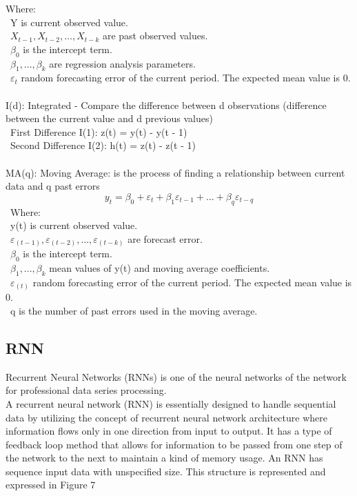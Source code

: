 \documentclass{ieeeojies}
\begin{document}
Where:\\
	\indent\textbullet\ Y is current observed value.\\
	\indent\textbullet\ \(X_{t-1}, X_{t-2}, \ldots, X_{t-k}\) are past observed
values.\\
	\indent\textbullet\ \(\beta_0\) is the intercept term.\\
	\indent\textbullet\ \(\beta_1,..., \beta_k\) are regression analysis
parameters.\\
	\indent\textbullet\ \(\varepsilon_{t}\) random forecasting error of the current
period. The expected mean value is 0.\\
\\
\indent I(d): Integrated - Compare the difference between d observations (difference
between the current value and d previous values)\\
\indent\textbullet\ First Difference I(1): z(t) = y(t) - y(t - 1)\\
\indent\textbullet\ Second Difference I(2): h(t) = z(t) - z(t - 1)\\
\\
\indent MA(q): Moving Average: is the process of finding a relationship between
current data and q past errors\
\indent \[y_{t} = \beta_0 + \varepsilon_{t} + \beta_1\varepsilon_{t - 1} + \ldots + \beta_q\varepsilon_{t - q}\]\
Where:\\
        \indent\textbullet\ y(t) is current observed value.\\
	\indent\textbullet\ \(\varepsilon_(t-1), \varepsilon_(t-2), \ldots, \varepsilon_(t-k)\) are forecast error.\\
	\indent\textbullet\ \(\beta_0\) is the intercept term.\\
	\indent\textbullet\ \(\beta_1,..., \beta_k\) mean values of y(t) and moving
average coefficients.\\
	\indent\textbullet\ \(\varepsilon_(t)\) random forecasting error of the current
period. The expected mean value is 0.\\
        \indent\textbullet\ q is the number of past errors used in the moving average.

\subsection{RNN}
\indent Recurrent Neural Networks (RNNs) \cite{b14} is one of the neural networks of the network for professional data series processing.
\\
\indent A recurrent neural network (RNN) is essentially designed to handle sequential data by utilizing the concept of recurrent neural network architecture where information flows only in one direction from input to output. It has a type of feedback loop method that allows for information to be passed from one step of the network to the next to maintain a kind of memory usage. An RNN has sequence input data with unspecified size. This structure is represented and expressed in Figure 7
\end{document}
